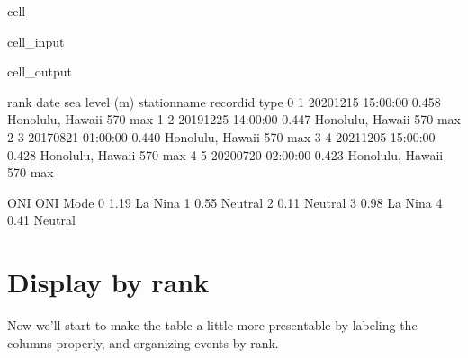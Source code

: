 \documentclass[letterpaper,10pt,english]{jupyterBook}
\begin{document}
\begin{sphinxuseclass}{cell}\begin{sphinxVerbatimInput}

\begin{sphinxuseclass}{cell_input}
\begin{sphinxVerbatim}[commandchars=\\\{\}]
  
\end{sphinxVerbatim}

\end{sphinxuseclass}\end{sphinxVerbatimInput}
\begin{sphinxVerbatimOutput}

\begin{sphinxuseclass}{cell_output}
\begin{sphinxVerbatim}[commandchars=\\\{\}]
   rank                date  sea level (m)      station\PYGZus{}name record\PYGZus{}id type  \PYGZbs{}
0     1 2020\PYGZhy{}12\PYGZhy{}15 15:00:00          0.458  Honolulu, Hawaii       570  max   
1     2 2019\PYGZhy{}12\PYGZhy{}25 14:00:00          0.447  Honolulu, Hawaii       570  max   
2     3 2017\PYGZhy{}08\PYGZhy{}21 01:00:00          0.440  Honolulu, Hawaii       570  max   
3     4 2021\PYGZhy{}12\PYGZhy{}05 15:00:00          0.428  Honolulu, Hawaii       570  max   
4     5 2020\PYGZhy{}07\PYGZhy{}20 02:00:00          0.423  Honolulu, Hawaii       570  max   

    ONI ONI Mode  
0 \PYGZhy{}1.19  La Nina  
1  0.55  Neutral  
2 \PYGZhy{}0.11  Neutral  
3 \PYGZhy{}0.98  La Nina  
4 \PYGZhy{}0.41  Neutral  
\end{sphinxVerbatim}

\end{sphinxuseclass}\end{sphinxVerbatimOutput}

\end{sphinxuseclass}

\section{Display by rank}
\label{\detokenize{notebooks/regional_and_local/SL_Rankings_annual:display-by-rank}}
\sphinxAtStartPar
Now we’ll start to make the table a little more presentable by labeling the columns properly, and organizing events by rank.
\end{document}
